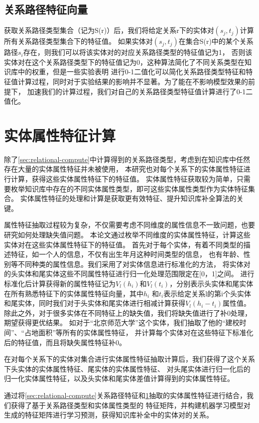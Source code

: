 \subsection{关系路径特征向量}
获取关系路径类型集合（记为S(r)）后，我们将给定关系r下的实体对$(s_j,t_j)$计算所有关系路径类型集合下的特征值。
如果实体对$(s_j,t_j)$在集合S(r)中的某个关系路径$s_i$存在，则我们可以将该实体对的对应关系路径类型的特征值记为1，
否则该实体对在这个关系路径类型下的特征值记为0，这种算法简化了不同关系类型在知识库中的权重，但是一些实验表明\cite{Gardner2014}
进行0-1二值化可以简化关系路径类型特征和特征值计算过程，同时对于实验结果的影响并不显著。为了能在不影响模型效果的前提下，
加速我们的计算过程，我们对自己的关系路径类型特征值计算进行了0-1二值化。

\section{实体属性特征计算}
\label{sec:literal-compute}
除了\ref{sec:relational-compute}中计算得到的关系路径类型，考虑到在知识库中任然存在大量的实体属性特征并未被使用，
本研究也对每个关系下的实体属性特征进行计算，获得这些实体属性特征下的特征值。
实体属性特征获取较为简单，只需要枚举知识库中存在的不同实体属性类型，即可这些实体属性类型作为实体特征集合。
实体属性特征的处理和计算是获取更有效特征、提升知识库补全算法的关键。

属性特征抽取过程较为复杂，不仅需要考虑不同维度的属性信息不一致问题，也要研究如何处理缺失值问题。
本论文通过枚举不同维度的实体属性特征，计算这些实体对在这些实体属性特征下的特征值。
首先对于每个实体，有着不同类型的描述特征，如一个人的信息，不仅有出生年月这种时间类型的信息，
也有年龄、性别等不同种类的属性信息。我们采用了对实体信息进行标准化的方法，
将实体对的头实体和尾实体这些不同属性特征进行归一化处理范围限定在[0，1]之间。
进行标准化后计算获得新的属性特征记为$V_l(h_i)$和$V_l (t_i)$，分别表示头实体和尾实体在所有熟悉特征下的实体属性特征向量，其中$h_i$ 和$t_i$表示给定关系l的第i个头实体和尾实体，同时我们对于头实体和尾实体进行相减计算获得$V_l(h_i-t_i )$属性值。除此之外，对于很多实体在不同特征上的缺失值，我们将缺失值进行了补0处理，期望获得更优结果。
如对于“北京师范大学”这个实体，我们抽取了他的“建校时间”、“占地面积”等所有的实体属性特征，
并计算每个实体对在这些特征下标准化后的特征值，而且将缺失属性特征补0。

在对每个关系下的实体对集合进行实体属性特征抽取计算后，我们获得了这个关系下头实体的实体属性特征、尾实体的实体属性特征、
对头尾实体进行归一化后的归一化实体属性特征，以及头实体和尾实体差值计算得到的实体属性特征。

通过将\ref{sec:relational-compute}关系路径特征和\ref{sec:literal-compute}抽取的实体属性特征进行结合，我们获得了基于关系路径类型和实体属性类型的
特征矩阵，并构建机器学习模型对生成的特征矩阵进行学习预测，获得知识库补全中的实体对的关系。 

